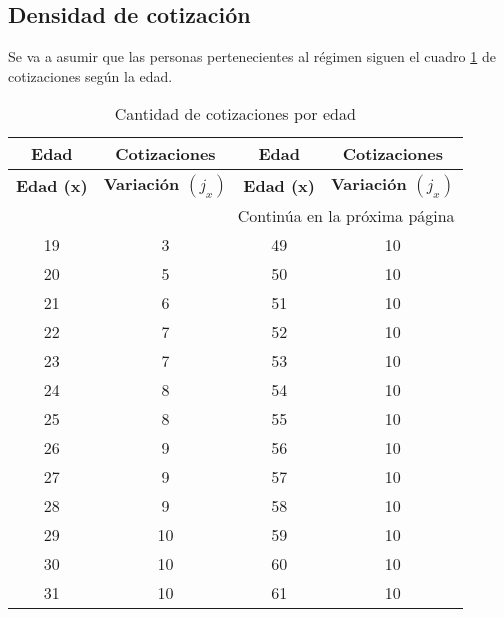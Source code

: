 \documentclass[
]{article}
\begin{document}
\subsection{Densidad de cotización}\label{densidad-de-cotizaciuxf3n}

Se va a asumir que las personas pertenecientes al régimen siguen el
cuadro \ref{tab:cotizaciones} de cotizaciones según la edad.

\begin{longtable}{|c|c|c|c|}
    \caption{Cantidad de cotizaciones por edad} \label{tab:cotizaciones} \\
    \hline
  \rowcolor{turquoise}
  \textbf{Edad} & \textbf{Cotizaciones} & \textbf{Edad} & \textbf{Cotizaciones} \\
  \hline
  \endfirsthead

  \hline
  \rowcolor{turquoise}
  \textbf{Edad (x)} & \textbf{Variación $(j_x)$} & \textbf{Edad (x)} & \textbf{Variación $(j_x)$} \\
  \hline
  \endhead

  \hline \multicolumn{4}{|r|}{{Continúa en la próxima página}} \\ \hline
  \endfoot

  \hline
  \endlastfoot

  19 & 3 & 49 & 10 \\

  20 & 5 & 50 & 10 \\

  21 & 6 & 51 & 10 \\

  22 & 7 & 52 & 10 \\

  23 & 7 & 53 & 10 \\

  24 & 8 & 54 & 10 \\

  25 & 8 & 55 & 10 \\

  26 & 9 & 56 & 10 \\

  27 & 9 & 57 & 10 \\

  28 & 9 & 58 & 10 \\

  29 & 10 & 59 & 10 \\

  30 & 10 & 60 & 10 \\

  31 & 10 & 61 & 10 \\


\end{longtable}
\end{document}
